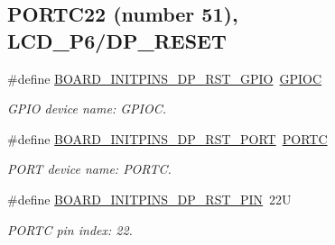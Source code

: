 \subsection*{P\+O\+R\+T\+C22 (number 51), L\+C\+D\+\_\+\+P6/\+D\+P\+\_\+\+R\+E\+S\+ET}
\begin{DoxyCompactItemize}
\item 
\mbox{\label{group__pin__mux_gae99962c0ea7bac0f93dc229ede0d0674}} 
\#define \mbox{\hyperlink{group__pin__mux_gae99962c0ea7bac0f93dc229ede0d0674}{B\+O\+A\+R\+D\+\_\+\+I\+N\+I\+T\+P\+I\+N\+S\+\_\+\+D\+P\+\_\+\+R\+S\+T\+\_\+\+G\+P\+IO}}~\mbox{\hyperlink{group___g_p_i_o___peripheral___access___layer_ga2dca03332d620196ba943bc2346eaa08}{G\+P\+I\+OC}}
\begin{DoxyCompactList}\small\item\em G\+P\+IO device name\+: G\+P\+I\+OC. \end{DoxyCompactList}\item 
\mbox{\label{group__pin__mux_gab8c88ede57842c22afc094ae7196848f}} 
\#define \mbox{\hyperlink{group__pin__mux_gab8c88ede57842c22afc094ae7196848f}{B\+O\+A\+R\+D\+\_\+\+I\+N\+I\+T\+P\+I\+N\+S\+\_\+\+D\+P\+\_\+\+R\+S\+T\+\_\+\+P\+O\+RT}}~\mbox{\hyperlink{group___p_o_r_t___peripheral___access___layer_ga68fea88642279a70246e026e7221b0a5}{P\+O\+R\+TC}}
\begin{DoxyCompactList}\small\item\em P\+O\+RT device name\+: P\+O\+R\+TC. \end{DoxyCompactList}\item 
\mbox{\label{group__pin__mux_gacd041365a9fa1f502b5af566f246dabf}} 
\#define \mbox{\hyperlink{group__pin__mux_gacd041365a9fa1f502b5af566f246dabf}{B\+O\+A\+R\+D\+\_\+\+I\+N\+I\+T\+P\+I\+N\+S\+\_\+\+D\+P\+\_\+\+R\+S\+T\+\_\+\+P\+IN}}~22U
\begin{DoxyCompactList}\small\item\em P\+O\+R\+TC pin index\+: 22. \end{DoxyCompactList}\end{DoxyCompactItemize}
